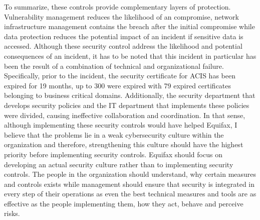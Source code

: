 To summarize, these controls provide complementary layers of protection. Vulnerability management reduces the likelihood of an compromise, network infrastructure management contains the breach after the initial compromise while data protection reduces the potential impact of an incident if sensitive data is accessed. 
\newline
Although these security control address the likelihood and potential consequences of an incident, it has to be noted that this incident in particular has been the result of a combination of technical and organizational failure. 
\newline
Specifically, prior to the incident, the security certificate for ACIS has been expired for 19 months, up to 300 were expired with 79 expired certificates belonging to business critical domains. Additionally, the security department that develops security policies and the IT department that implements these policies were divided, causing ineffective collaboration and coordination.
\newline
In that sense, although implementing these security controls would have helped Equifax, I believe that the problems lie in a weak cybersecurity culture within the organization and therefore, strengthening this culture should have the highest priority before implementing security controls.
\newline
Equifax should focus on developing an actual security culture rather than to implementing security controls. The people in the organization should understand, why certain measures and controls exists while management should ensure that security is integrated in every step of their operations as even the best technical measures and tools are as effective as the people implementing them, how they act, behave and perceive risks.